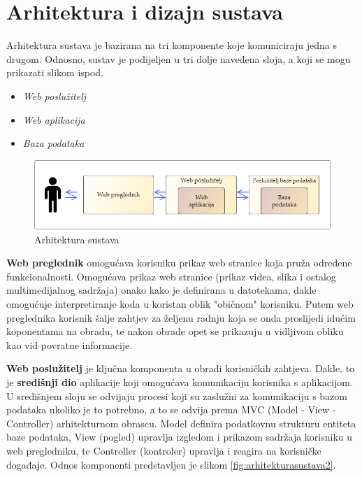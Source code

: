 \chapter{Arhitektura i dizajn sustava}

\textnormal{Arhitektura sustava je bazirana na tri komponente koje komuniciraju jedna s drugom. Odnosno, sustav je podijeljen u tri dolje navedena sloja, a koji se mogu prikazati slikom ispod.}
\begin{itemize}
	\item 	\textit{Web poslužitelj}
	\item 	\textit{Web aplikacija}
	\item 	\textit{Baza podataka}
\end{itemize}

\begin{figure}[H]
	\includegraphics[width=\textwidth]{slike/arhitekturaSustava.png} %
	\centering
	\caption{Arhitektura sustava}
	\label{fig:arhitekturasustava}
\end{figure}

\textnormal{\textbf{Web preglednik} omogućava korisniku prikaz web stranice koja pruža određene funkcionalnosti. Omogućava prikaz web stranice (prikaz videa, slika i ostalog multimedijalnog sadržaja) onako kako je definirana u datotekama, dakle omogućuje interpretiranje koda u koristan oblik "običnom" korisniku.
	Putem web preglednika korisnik šalje zahtjev za željenu radnju koja se onda proslijedi idućim koponentama na obradu, te nakon obrade opet se prikazuju u vidljivom obliku kao vid povratne informacije.}

\textnormal{\textbf{Web poslužitelj} je ključna komponenta u obradi korisničkih zahtjeva.
	Dakle, to je \textbf{središnji dio} aplikacije koji omogućava komunikaciju korisnika s aplikacijom.
	U središnjem sloju se odvijaju procesi koji su zaslužni za komunikaciju s bazom podataka ukoliko je to potrebno, a to se odvija
	prema MVC (Model - View - Controller) arhitekturnom obrascu. Model definira podatkovnu strukturu entiteta baze podataka,
	View (pogled) upravlja izgledom i prikazom sadržaja korisniku u web pregledniku, te Controller (kontroler) upravlja i reagira
	na korisničke događaje.
	Odnos komponenti predstavljen je slikom \ref{fig:arhitekturasustava2}.}

